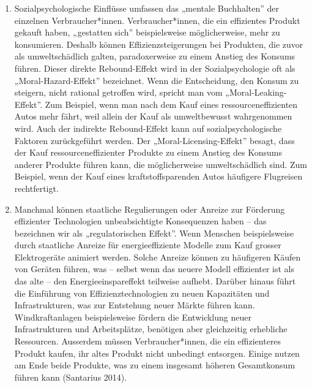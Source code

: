 \documentclass[
  nswissgerman,
  a4paper,
  DIV=11,
  numbers=noendperiod,
  oneside,
  openany]{scrreprt}
\begin{document}
\begin{enumerate}
\def\labelenumi{\arabic{enumi}.}
\setcounter{enumi}{1}
\item
  Sozialpsychologische Einflüsse umfassen das „mentale Buchhalten'' der
  einzelnen Verbraucher*innen. Verbraucher*innen, die ein effizientes
  Produkt gekauft haben, „gestatten sich'' beispielsweise
  möglicherweise, mehr zu konsumieren. Deshalb können
  Effizienzsteigerungen bei Produkten, die zuvor als umweltschädlich
  galten, paradoxerweise zu einem Anstieg des Konsums führen. Dieser
  direkte Rebound-Effekt wird in der Sozialpsychologie oft als
  „Moral-Hazard-Effekt'' bezeichnet. Wenn die Entscheidung, den Konsum
  zu steigern, nicht rational getroffen wird, spricht man vom
  „Moral-Leaking-Effekt''. Zum Beispiel, wenn man nach dem Kauf eines
  ressourceneffizienten Autos mehr fährt, weil allein der Kauf als
  umweltbewusst wahrgenommen wird. Auch der indirekte Rebound-Effekt
  kann auf sozialpsychologische Faktoren zurückgeführt werden. Der
  „Moral-Licensing-Effekt'' besagt, dass der Kauf ressourceneffizienter
  Produkte zu einem Anstieg des Konsums anderer Produkte führen kann,
  die möglicherweise umweltschädlich sind. Zum Beispiel, wenn der Kauf
  eines kraftstoffsparenden Autos häufigere Flugreisen rechtfertigt.
\item
  Manchmal können staatliche Regulierungen oder Anreize zur Förderung
  effizienter Technologien unbeabsichtigte Konsequenzen haben -- das
  bezeichnen wir als „regulatorischen Effekt''. Wenn Menschen
  beispielsweise durch staatliche Anreize für energieeffiziente Modelle
  zum Kauf grosser Elektrogeräte animiert werden. Solche Anreize können
  zu häufigeren Käufen von Geräten führen, was -- selbst wenn das neuere
  Modell effizienter ist als das alte -- den Energieeinspareffekt
  teilweise aufhebt. Darüber hinaus führt die Einführung von
  Effizienztechnologien zu neuen Kapazitäten und Infrastrukturen, was
  zur Entstehung neuer Märkte führen kann. Windkraftanlagen
  beispielsweise fördern die Entwicklung neuer Infrastrukturen und
  Arbeitsplätze, benötigen aber gleichzeitig erhebliche Ressourcen.
  Ausserdem müssen Verbraucher*innen, die ein effizienteres Produkt
  kaufen, ihr altes Produkt nicht unbedingt entsorgen. Einige nutzen am
  Ende beide Produkte, was zu einem insgesamt höheren Gesamtkonsum
  führen kann (Santarius 2014).
\end{enumerate}
\end{document}
